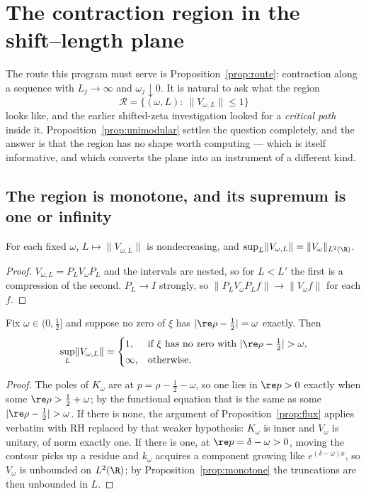 \section{The contraction region in the shift--length plane}\label{sec:region}

The route this program must serve is Proposition~\ref{prop:route}: contraction
along a sequence with $L_j\to\infty$ and $\omega_j\downarrow0$. It is natural to
ask what the region
\[
 \mathcal R=\big\{(\omega,L):\ \lVert V_{\omega,L}\rVert\leq1\big\}
\]
looks like, and the earlier shifted-zeta investigation
\cite{CriticalPath,CumulativePath} looked for a \emph{critical path} inside it.
Proposition~\ref{prop:unimodular} settles the question completely, and the answer
is that the region has no shape worth computing --- which is itself informative,
and which converts the plane into an instrument of a different kind.

\subsection{The region is monotone, and its supremum is one or infinity}

\begin{proposition}[Monotonicity]\label{prop:monotone}
For each fixed $\omega$, $L\mapsto\lVert V_{\omega,L}\rVert$ is nondecreasing, and
$\sup_L\lVert V_{\omega,L}\rVert=\lVert V_\omega\rVert_{L^2(\R)}$.
\end{proposition}

\begin{proof}
$V_{\omega,L}=P_LV_\omega P_L$ and the intervals are nested, so for $L<L'$ the
first is a compression of the second. $P_L\to I$ strongly, so
$\lVert P_LV_\omega P_Lf\rVert\to\lVert V_\omega f\rVert$ for each $f$.
\end{proof}

\begin{proposition}[Dichotomy]\label{prop:dichotomy}
Fix $\omega\in(0,\frac12]$ and suppose no zero of $\xi$ has
$|\re\rho-\frac12|=\omega$ exactly. Then
\[
 \sup_L\lVert V_{\omega,L}\rVert=
 \begin{cases}
 1,&\text{if $\xi$ has no zero with }|\re\rho-\tfrac12|>\omega,\\[2pt]
 \infty,&\text{otherwise.}
 \end{cases}
\]
\end{proposition}

\begin{proof}
The poles of $K_\omega$ are at $p=\rho-\frac12-\omega$, so one lies in
$\re p>0$ exactly when some $\re\rho>\frac12+\omega$; by the functional equation
that is the same as some $|\re\rho-\frac12|>\omega$. If there is none, the
argument of Proposition~\ref{prop:flux} applies verbatim with RH replaced by that
weaker hypothesis: $K_\omega$ is inner and $V_\omega$ is unitary, of norm exactly
one. If there is one, at $\re p=\delta-\omega>0$, moving the contour picks up a
residue and $k_\omega$ acquires a component growing like $e^{(\delta-\omega)x}$,
so $V_\omega$ is unbounded on $L^2(\R)$; by Proposition~\ref{prop:monotone} the
truncations are then unbounded in $L$.
\end{proof}

